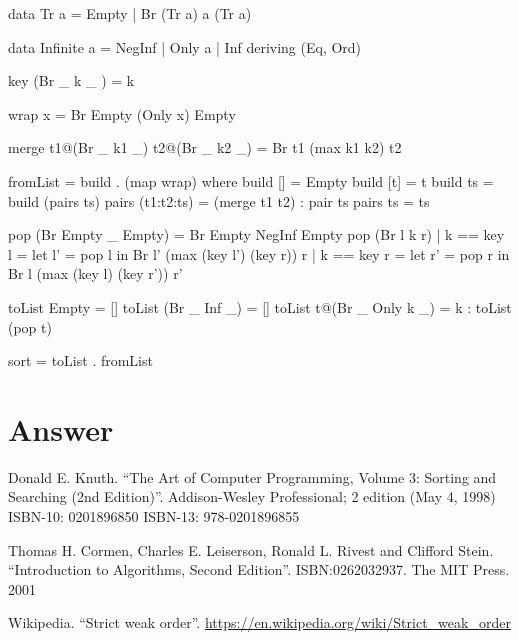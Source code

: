 \documentclass[b5paper]{article}
\begin{document}
\begin{Haskell}
data Tr a = Empty | Br (Tr a) a (Tr a)

data Infinite a = NegInf | Only a | Inf deriving (Eq, Ord)

key (Br _ k _ ) = k

wrap x = Br Empty (Only x) Empty

merge t1@(Br _ k1 _) t2@(Br _ k2 _) = Br t1 (max k1 k2) t2

fromList = build . (map wrap) where
  build [] = Empty
  build [t] = t
  build ts = build (pairs ts)
  pairs (t1:t2:ts) = (merge t1 t2) : pair ts
  pairs ts = ts

pop (Br Empty _ Empty) = Br Empty NegInf Empty
pop (Br l k r) | k == key l = let l' = pop l in Br l' (max (key l') (key r)) r
               | k == key r = let r' = pop r in Br l (max (key l) (key r')) r'

toList Empty = []
toList (Br _ Inf _) = []
toList t@(Br _ Only k _) = k : toList (pop t)

sort = toList . fromList
\end{Haskell}

\ifx\wholebook\relax\else
\section{Answer}
\shipoutAnswer

\begin{thebibliography}{99}

Donald E. Knuth. ``The Art of Computer Programming, Volume 3: Sorting and Searching (2nd Edition)''. Addison-Wesley Professional; 2 edition (May 4, 1998) ISBN-10: 0201896850 ISBN-13: 978-0201896855

Thomas H. Cormen, Charles E. Leiserson, Ronald L. Rivest and Clifford Stein.
``Introduction to Algorithms, Second Edition''. ISBN:0262032937. The MIT Press. 2001

Wikipedia. ``Strict weak order''. \url{https://en.wikipedia.org/wiki/Strict_weak_order}

\end{thebibliography}

\expandafter\enddocument
\fi
\end{document}
